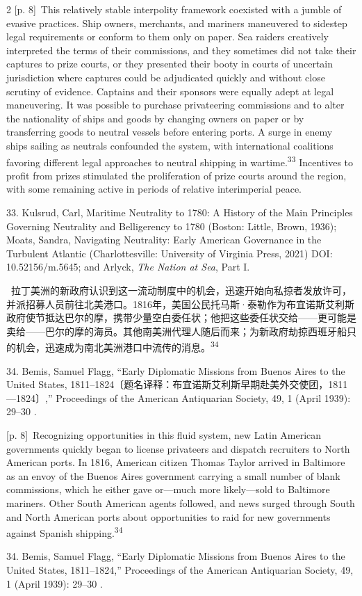 \documentclass[10pt,a4paper]{article}
\begin{document}
\begin{paracol}{2}
\switchcolumn
{\scriptsize\color{gray} [p. 8]}\ This relatively stable interpolity framework coexisted with a jumble of evasive practices. Ship owners, merchants, and mariners maneuvered to sidestep legal requirements or conform to them only on paper. Sea raiders creatively interpreted the terms of their commissions, and they sometimes did not take their captures to prize courts, or they presented their booty in courts of uncertain jurisdiction where captures could be adjudicated quickly and without close scrutiny of evidence. Captains and their sponsors were equally adept at legal maneuvering. It was possible to purchase privateering commissions and to alter the nationality of ships and goods by changing owners on paper or by transferring goods to neutral vessels before entering ports. A surge in enemy ships sailing as neutrals confounded the system, with international coalitions favoring different legal approaches to neutral shipping in wartime.\nobreak\textsuperscript{33} Incentives to profit from prizes stimulated the proliferation of prize courts around the region, with some remaining active in periods of relative interimperial peace.\par{\small 33. Kulsrud, Carl, Maritime Neutrality to 1780: A History of the Main Principles Governing Neutrality and Belligerency to 1780 (Boston: Little, Brown, 1936); Moats, Sandra, Navigating Neutrality: Early American Governance in the Turbulent Atlantic (Charlottesville: University of Virginia Press, 2021) DOI: 10.52156/m.5645; and Arlyck, \textit{The Nation at Sea}, Part I.\par}
\switchcolumn*
{\scriptsize\color{gray} [p. 8]}\ 拉丁美洲的新政府认识到这一流动制度中的机会，迅速开始向私掠者发放许可，并派招募人员前往北美港口。1816年，美国公民托马斯·泰勒作为布宜诺斯艾利斯政府使节抵达巴尔的摩，携带少量空白委任状；他把这些委任状交给——更可能是卖给——巴尔的摩的海员。其他南美洲代理人随后而来；为新政府劫掠西班牙船只的机会，迅速成为南北美洲港口中流传的消\mbox{息。\textsuperscript{34}}\par{\small 34. Bemis, Samuel Flagg, “Early Diplomatic Missions from Buenos Aires to the United States, 1811–1824〔题名译释：布宜诺斯艾利斯早期赴美外交使团，1811—1824〕,” Proceedings of the American Antiquarian Society, 49, 1 (April 1939): 29–30 .\par}
\switchcolumn
{\scriptsize\color{gray} [p. 8]}\ Recognizing opportunities in this fluid system, new Latin American governments quickly began to license privateers and dispatch recruiters to North American ports. In 1816, American citizen Thomas Taylor arrived in Baltimore as an envoy of the Buenos Aires government carrying a small number of blank commissions, which he either gave or—much more likely—sold to Baltimore mariners. Other South American agents followed, and news surged through South and North American ports about opportunities to raid for new governments against Spanish shipping.\nobreak\textsuperscript{34}\par{\small 34. Bemis, Samuel Flagg, “Early Diplomatic Missions from Buenos Aires to the United States, 1811–1824,” Proceedings of the American Antiquarian Society, 49, 1 (April 1939): 29–30 .\par}

\end{paracol}
\end{document}
